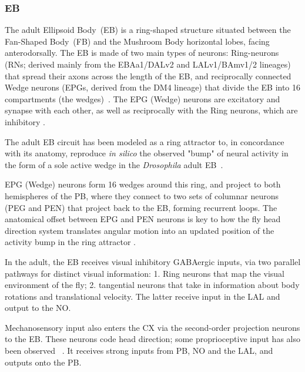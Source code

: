         \subsubsection{EB}
        The adult Ellipsoid Body~(EB) is a ring-shaped structure situated between the Fan-Shaped Body~(FB) and the Mushroom Body horizontal lobes, facing anterodorsally.
        The EB is made of two main types of neurons: Ring-neurons (RNs; derived mainly from the EBAa1/DALv2 and LALv1/BAmv1/2 lineages) that spread their axons across the length of the EB, and reciprocally connected Wedge neurons (EPGs, derived from the DM4 lineage) that divide the EB into 16 compartments (the wedges)~\citep{wolff2015neuroarchitecture}.
        The EPG (Wedge) neurons are excitatory and synapse with each other, as well as reciprocally with the Ring neurons, which are inhibitory \citep{franconville2018building, hulse2021connectome}.

        The adult EB circuit has been modeled as a ring attractor \citep{Stone2017CXModel} to, in concordance with its anatomy, reproduce \textit{in silico} the observed "bump" of neural activity in the form of a sole active wedge in the \textit{Drosophila} adult EB~\citep{seelig2015neural}.

        EPG (Wedge) neurons form 16 wedges around this ring, and project to both hemispheres of the PB, where they connect to two sets of columnar neurons (PEG and PEN) that project back to the EB, forming recurrent loops.
        The anatomical offset between EPG and PEN neurons is key to how the fly head direction system translates angular motion into an updated position of the activity bump in the ring attractor \citep{Stone2017CXModel}.

        In the adult, the EB receives visual inhibitory GABAergic inputs, via two parallel pathways for distinct visual information: 1. Ring neurons that map the visual environment of the fly; 2. tangential neurons that take in information about body rotations and translational velocity. The latter receive input in the LAL and output to the NO.

        Mechanosensory input also enters the CX via the second-order projection neurons to the EB. These neurons code head direction; some proprioceptive input has also been observed ~\citep{hulse2021connectome}. It receives strong inputs from PB, NO and the LAL, and outputs onto the PB.
